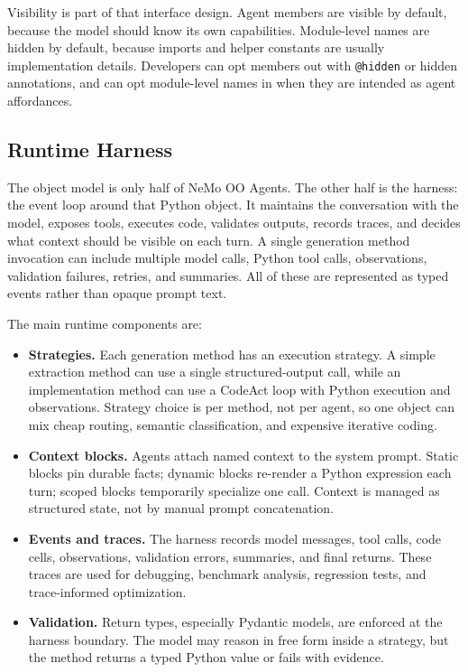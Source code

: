 \documentclass[11pt, logo, onecolumn, copyright, colorlinks=true, allcolors=blue]{nvidiatechreport}
\begin{document}
Visibility is part of that interface design.  Agent members are visible by
default, because the model should know its own capabilities.  Module-level names
are hidden by default, because imports and helper constants are usually
implementation details.  Developers can opt members out with \texttt{@hidden} or
hidden annotations, and can opt module-level names in when they are intended as
agent affordances.

\subsection{Runtime Harness}
\label{sec:harness}

The object model is only half of NeMo OO Agents.  The other half is the harness:
the event loop around that Python object.  It maintains the conversation with
the model, exposes tools, executes code, validates outputs, records traces, and
decides what context should be visible on each turn.  A single generation method
invocation can include multiple model calls, Python tool calls, observations,
validation failures, retries, and summaries.  All of these are represented as
typed events rather than opaque prompt text.

The main runtime components are:

\begin{itemize}
  \item \textbf{Strategies.}  Each generation method has an execution strategy.
        A simple extraction method can use a single structured-output call,
        while an implementation method can use a CodeAct loop with Python
        execution and observations.  Strategy choice is per method, not per
        agent, so one object can mix cheap routing, semantic classification,
        and expensive iterative coding.
  \item \textbf{Context blocks.}  Agents attach named context to the system
        prompt.  Static blocks pin durable facts; dynamic blocks re-render a
        Python expression each turn; scoped blocks temporarily specialize one
        call.  Context is managed as structured state, not by manual prompt
        concatenation.
  \item \textbf{Events and traces.}  The harness records model messages, tool
        calls, code cells, observations, validation errors, summaries, and final
        returns.  These traces are used for debugging, benchmark analysis,
        regression tests, and trace-informed optimization.
  \item \textbf{Validation.}  Return types, especially Pydantic models, are
        enforced at the harness boundary.  The model may reason in free form
        inside a strategy, but the method returns a typed Python value or fails
        with evidence.
\end{itemize}
\end{document}
